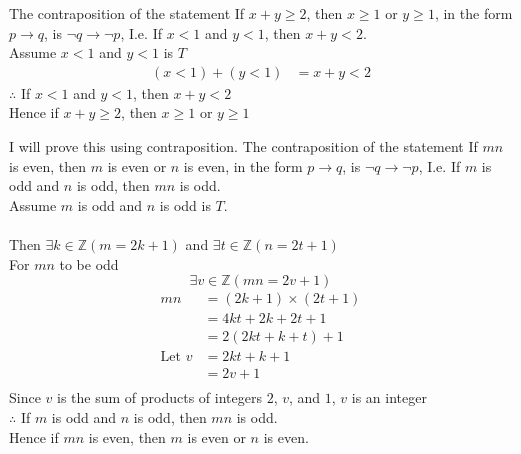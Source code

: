 \documentclass[12pt letter]{report}
\begin{document}

\begin{myproof}
  The contraposition of the statement If $x + y \geq 2$, then $x \geq 1$ or $y \geq 1$, in the form $p \to q$, is
  $\neg q \to \neg p$, I.e. If $x < 1$ and $y < 1$, then $x + y < 2$.\\
  Assume $x < 1$ and $y < 1$ is $T$ \\
  \begin{align*}
    \left( x < 1 \right) + \left( y < 1 \right) & = x + y < 2
  \end{align*}
  $\therefore$ If $x < 1$ and $y < 1$, then $x + y < 2$\\
  Hence if $x + y \geq 2$, then $x \geq 1$ or $y \geq 1$
\end{myproof}


\begin{myproof}
  I will prove this using contraposition. The contraposition of the statement If $mn$ is even, then $m$ is even or $n$
  is even, in the form $p \to q$, is $\neg q \to \neg p$, I.e. If $m$ is odd and $n$ is odd, then $mn$ is odd. \\
  Assume $m$ is odd and $n$ is odd is $T$.\\
  \\
  Then $\exists k \in \mathbb{Z} \left( m = 2k + 1 \right) $ and $\exists t \in \mathbb{Z} \left( n = 2t + 1 \right) $\\
  For $mn$ to be odd\\
  \[
    \exists v \in \mathbb{Z} \left( mn = 2v +1 \right)
  \]
  \begin{align*}
    mn            & = \left( 2k + 1 \right) \times  \left( 2t + 1  \right) \\
                  & = 4kt + 2k + 2t + 1                                    \\
                  & = 2 \left( 2kt + k + t \right) +1                      \\
    \text{Let } v & = 2kt + k + 1                                          \\
                  & = 2v + 1                                               \\
  \end{align*}
  Since $v$ is the sum of products of integers $2$, $v$, and $1$, $v$ is an integer\\
  $\therefore$ If $m$ is odd and $n$ is odd, then $mn$ is odd.\\
  Hence if $mn$ is even, then $m$ is even or $n$ is even.

\end{myproof}
\end{document}
